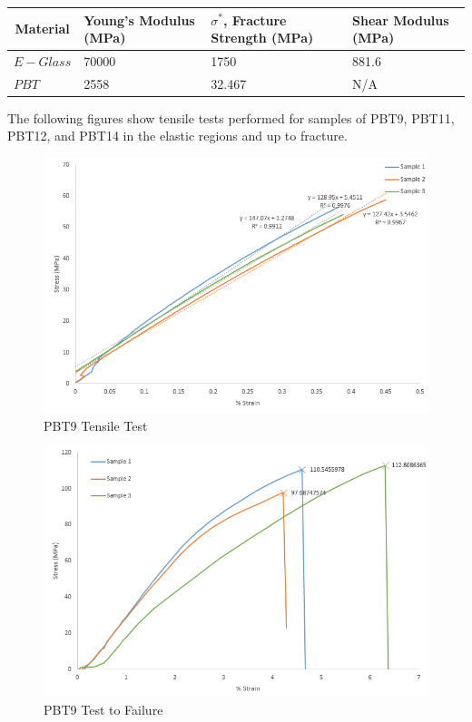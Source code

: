 \documentclass[11pt]{article}
\begin{document}
\onehalfspacing
\begin{center}
 \label{tab:MaterialValues}
\begin{tabular}{p{2cm} || p{2.75cm} | p{2.75cm} | p{2.75cm} }
\hline
\multicolumn{1}{c||}{Material} & Young's Modulus (MPa) & \(\sigma^*\), Fracture Strength (MPa) & Shear Modulus (MPa) \\
\hline
\hline
\(E-Glass\) & 70000 &  1750 & 881.6 \\
\(PBT\) & 2558 & 32.467 & N/A\\
\hline
\end{tabular}
\end{center}
\singlespacing
\vspace{1em}


The following figures show tensile tests performed for samples of PBT9, PBT11, PBT12, and PBT14 in the elastic regions and up to fracture.
\\
\begin{figure}[H]
\centering
\includegraphics[width=.95\linewidth]{figures/PBT9_Tensile.png}
\caption{PBT9 Tensile Test}
\label{pbt9tensile}
\end{figure}

\begin{figure}[H]
\centering
\includegraphics[width=.95\linewidth]{figures/PBT9_Fail.png}
\caption{PBT9 Test to Failure}
\label{pbt9fail}
\end{figure}
\end{document}
